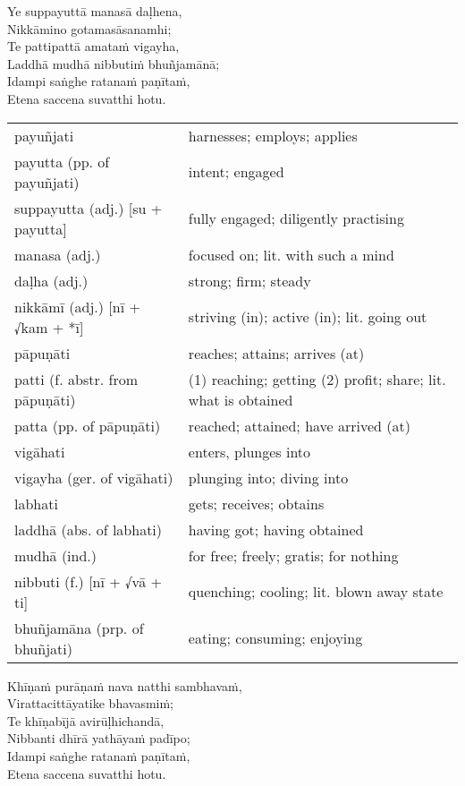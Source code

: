 \documentclass[11pt,oneside]{memoir}
\begin{document}
\clearpage

\begin{spacedquote}
Ye suppayuttā manasā daḷhena, \\[0pt]
Nikkāmino gotamasāsanamhi; \\[0pt]
Te pattipattā amataṁ vigayha, \\[0pt]
Laddhā mudhā nibbutiṁ bhuñjamānā; \\[0pt]
Idampi saṅghe ratanaṁ paṇītaṁ, \\[0pt]
Etena saccena suvatthi hotu.
\end{spacedquote}

\begin{longtable}{L{\colOne} L{\colTwo}}
payuñjati & harnesses; employs; applies\\[0pt]
payutta (pp. of payuñjati) & intent; engaged\\[0pt]
suppayutta (adj.) [su + payutta] & fully engaged; diligently practising\\[0pt]
manasa (adj.) & focused on; lit. with such a mind\\[0pt]
daḷha (adj.) & strong; firm; steady\\[0pt]
nikkāmī (adj.) [nī + √kam + *ī] & striving (in); active (in); lit. going out\\[0pt]
pāpuṇāti & reaches; attains; arrives (at)\\[0pt]
patti (f. abstr. from pāpuṇāti) & (1) reaching; getting (2) profit; share; lit. what is obtained\\[0pt]
patta (pp. of pāpuṇāti) & reached; attained; have arrived (at)\\[0pt]
vigāhati & enters, plunges into\\[0pt]
vigayha (ger. of vigāhati) & plunging into; diving into\\[0pt]
labhati & gets; receives; obtains\\[0pt]
laddhā (abs. of labhati) & having got; having obtained\\[0pt]
mudhā (ind.) & for free; freely; gratis; for nothing\\[0pt]
nibbuti (f.) [nī + √vā + ti] & quenching; cooling; lit. blown away state\\[0pt]
bhuñjamāna (prp. of bhuñjati) & eating; consuming; enjoying\\[0pt]
\end{longtable}

\clearpage

\begin{spacedquote}
Khīṇaṁ purāṇaṁ nava natthi sambhavaṁ, \\[0pt]
Virattacittāyatike bhavasmiṁ; \\[0pt]
Te khīṇabījā avirūḷhichandā, \\[0pt]
Nibbanti dhīrā yathāyaṁ padīpo; \\[0pt]
Idampi saṅghe ratanaṁ paṇītaṁ, \\[0pt]
Etena saccena suvatthi hotu.
\end{spacedquote}
\end{document}
